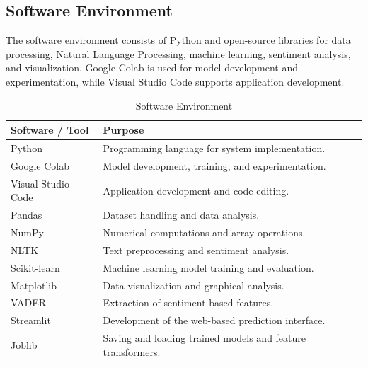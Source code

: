 \documentclass[12pt,a4paper]{report}
\begin{document}
\subsection{Software Environment}

The software environment consists of Python and
open-source libraries for data processing, Natural
Language Processing, machine learning, sentiment
analysis, and visualization. Google Colab is used
for model development and experimentation, while
Visual Studio Code supports application development.

\begin{table}[H]
\centering
\caption{Software Environment}
\label{tab:software_environment}

\renewcommand{\arraystretch}{1.4}
\setlength{\tabcolsep}{10pt}

\begin{tabular}{|
>{\raggedright\arraybackslash}p{3.8cm}|
>{\raggedright\arraybackslash}p{8.2cm}|}
\hline
\textbf{Software / Tool} & \textbf{Purpose} \\ \hline

Python & Programming language for system implementation. \\ \hline

Google Colab & Model development, training, and experimentation. \\ \hline

Visual Studio Code & Application development and code editing. \\ \hline

Pandas & Dataset handling and data analysis. \\ \hline

NumPy & Numerical computations and array operations. \\ \hline

NLTK & Text preprocessing and sentiment analysis. \\ \hline

Scikit-learn & Machine learning model training and evaluation. \\ \hline

Matplotlib & Data visualization and graphical analysis. \\ \hline

VADER & Extraction of sentiment-based features. \\ \hline

Streamlit & Development of the web-based prediction interface. \\ \hline

Joblib & Saving and loading trained models and feature transformers. \\ \hline

\end{tabular}

\end{table}
\end{document}
